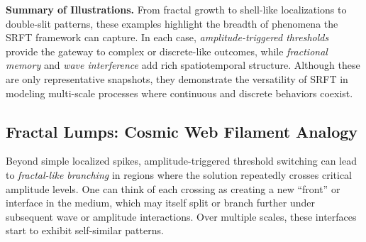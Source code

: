 \documentclass[12pt]{article}
\begin{document}
\medskip

\noindent
\textbf{Summary of Illustrations.}
From fractal growth to shell-like localizations to double-slit patterns, these
examples highlight the breadth of phenomena the SRFT framework can capture. In
each case, \emph{amplitude-triggered thresholds} provide the gateway to complex
or discrete-like outcomes, while \emph{fractional memory} and \emph{wave
interference} add rich spatiotemporal structure. Although these are only
representative snapshots, they demonstrate the versatility of SRFT in modeling
multi-scale processes where continuous and discrete behaviors coexist.


\subsection{Fractal Lumps: Cosmic Web Filament Analogy}
\label{subsec:fractal_lumps_cosmic}

Beyond simple localized spikes, amplitude-triggered threshold switching can
lead to \emph{fractal-like branching} in regions where the solution repeatedly
crosses critical amplitude levels. One can think of each crossing as creating
a new “front” or interface in the medium, which may itself split or branch 
further under subsequent wave or amplitude interactions. Over multiple scales, 
these interfaces start to exhibit self-similar patterns. 
\end{document}
